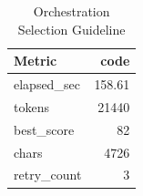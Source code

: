 \begin{table}[t]
\centering
\caption{Orchestration Selection Guideline}
\label{tab:guideline}
\begin{tabular}{lr}
\toprule
Metric & code \\
\midrule
elapsed\_sec & 158.61 \\
tokens & 21440 \\
best\_score & 82 \\
chars & 4726 \\
retry\_count & 3 \\
\bottomrule
\end{tabular}
\end{table}